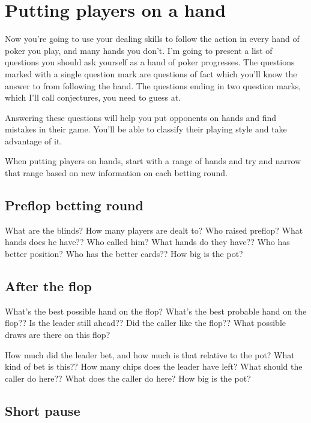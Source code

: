 \chapter{Putting players on a hand}


Now you're going to use your dealing skills to follow the action in
every hand of poker you play, and many hands you don't. I'm going
to present a list of questions you should ask yourself as
a hand of poker progresses. The questions marked with a single question
mark are questions of fact which you'll know the answer to from
following the hand. The questions ending in two question marks, which
I'll call conjectures, you need to guess at.

Answering these questions will help you put opponents on hands and
find mistakes in their game. You'll be able to classify their
playing style and take advantage of it.

When putting players on hands, start with a range of hands
and try and narrow that range based on new information on each
betting round.

\section{Preflop betting round}

What are the blinds? How many players are dealt to? Who raised preflop?
What hands does he have?? Who called him? What hands do they have??
Who has better position? Who has the better cards?? How big is the pot?

\section{After the flop}

What's the best possible hand on the flop? What's the best probable
hand on the flop?? Is the leader still ahead?? Did the caller
like the flop?? What possible draws are there on this flop?

How much did the leader bet, and how much is that relative to the pot?
What kind of bet is this?? How many chips does the leader have left?
What should the caller do here?? What does the caller do here? How
big is the pot?

\section{Short pause}

